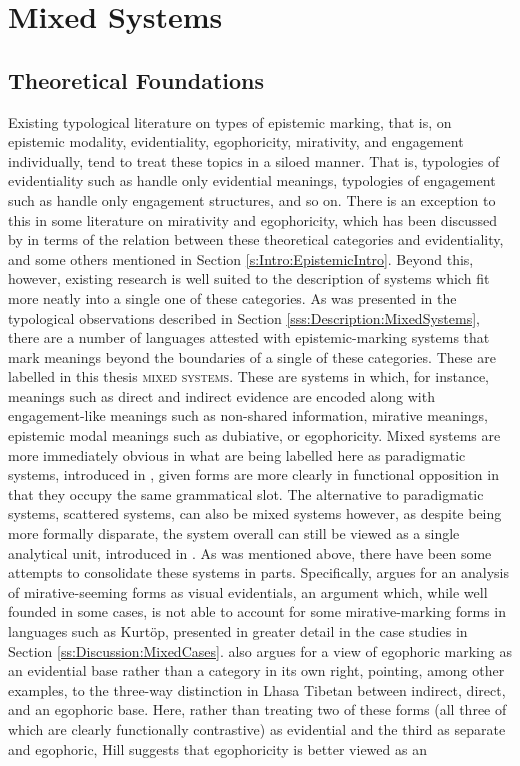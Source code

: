 \section{Mixed Systems}\label{s:Discussion:Mixed}
\subsection{Theoretical Foundations}\label{ss:Discussion:MixedFoundation}
Existing typological literature on types of epistemic marking, that is, on epistemic modality, evidentiality, egophoricity, mirativity, and engagement individually, tend to treat these topics in a siloed manner. That is, typologies of evidentiality such as  handle only evidential meanings, typologies of engagement such as  handle only engagement structures, and so on. There is an exception to this in some literature on mirativity and egophoricity, which has been discussed by  in terms of the relation between these theoretical categories and evidentiality, and some others mentioned in Section \ref{s:Intro:EpistemicIntro}. Beyond this, however, existing research is well suited to the description of systems which fit more neatly into a single one of these categories. As was presented in the typological observations described in Section \ref{sss:Description:MixedSystems}, there are a number of languages attested with epistemic-marking systems that mark meanings beyond the boundaries of a single of these categories. These are labelled in this thesis \textsc{mixed systems}. These are systems in which, for instance, meanings such as direct and indirect evidence are encoded along with engagement-like meanings such as non-shared information, mirative meanings, epistemic modal meanings such as dubiative, or egophoricity. Mixed systems are more immediately obvious in what are being labelled here as paradigmatic systems, introduced in , given forms are more clearly in functional opposition in that they occupy the same grammatical slot. The alternative to paradigmatic systems, scattered systems, can also be mixed systems however, as despite being more formally disparate, the system overall can still be viewed as a single analytical unit, introduced in . As was mentioned above, there have been some attempts to consolidate these systems in parts. Specifically,  argues for an analysis of mirative-seeming forms as visual evidentials, an argument which, while well founded in some cases, is not able to account for some mirative-marking forms in languages such as Kurtöp, presented in greater detail in the case studies in Section \ref{ss:Discussion:MixedCases}.  also argues for a view of egophoric marking as an evidential base rather than a category in its own right, pointing, among other examples, to the three-way distinction in Lhasa Tibetan between indirect, direct, and an egophoric base. Here, rather than treating two of these forms (all three of which are clearly functionally contrastive) as evidential and the third as separate and egophoric, Hill suggests that egophoricity is better viewed as an 